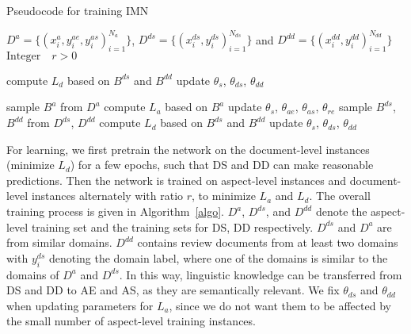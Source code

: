 \documentclass[11pt,a4paper]{article}
\begin{document}
\begin{algorithm}[t]
\caption{Pseudocode for training IMN }
\begin{algorithmic} 
\REQUIRE $D^{a} = \{(x^a_i, y^{ae}_i, y^{as}_i)_{i=1}^{N_a}\}$, $D^{ds}=\{(x_i^{ds}, y_i^{ds})_{i=1}^{N_{ds}}\}$ and $D^{dd}=\{(x_i^{dd}, y_i^{dd})_{i=1}^{N_{dd}}\}$
\REQUIRE $\text{Integer} \quad r>0$
\medskip

     \STATE compute $L_d$ based on $B^{ds}$ and $B^{dd}$
     \STATE update $\theta_{s}$, $\theta_{ds}$, $\theta_{dd}$
     \ENDFOR
\ENDFOR
\medskip

    \STATE sample $B^{a}$ from $D^{a}$
    \STATE compute $L_a$ based on $B^{a}$
    \STATE update $\theta_{s}$, $\theta_{ae}$, $\theta_{as}$, $\theta_{re}$
    \STATE sample $B^{ds}$, $B^{dd}$ from $D^{ds}$, $D^{dd}$
     \STATE compute $L_d$ based on $B^{ds}$ and $B^{dd}$
     \STATE update $\theta_{s}$, $\theta_{ds}$, $\theta_{dd}$
     \ENDIF
    \ENDFOR
\ENDFOR
\end{algorithmic}\label{algo}
\end{algorithm}

For learning, we first pretrain the network on the document-level instances (minimize $L_d$) for a few epochs, such that DS and DD can make reasonable predictions. Then the network is trained on aspect-level instances and document-level instances alternately with ratio $r$, to minimize $L_a$ and $L_d$. The overall training process is given in Algorithm~\ref{algo}. $D^{a}$, $D^{ds}$, and $D^{dd}$ denote the aspect-level training set and the training sets for DS, DD respectively. $D^{ds}$ and $D^{a}$ are from similar domains. $D^{dd}$ contains review documents from at least two domains with $y_i^{ds}$ denoting the domain label, where one of the domains is similar to the domains of $D^{a}$ and $D^{ds}$. In this way, linguistic knowledge can be transferred from DS and DD to AE and AS, as they are semantically relevant. We fix $\theta_{ds}$ and $\theta_{dd}$ when updating parameters for $L_a$, since we do not want them to be affected by the small number of aspect-level training instances. 


\renewcommand{\arraystretch}{1.1}
\begin{table}[t]
\centering
\small
{}
\caption{Dataset statistics with numbers of aspect terms and opinion terms}\label{data}
\end{table}
\end{document}
